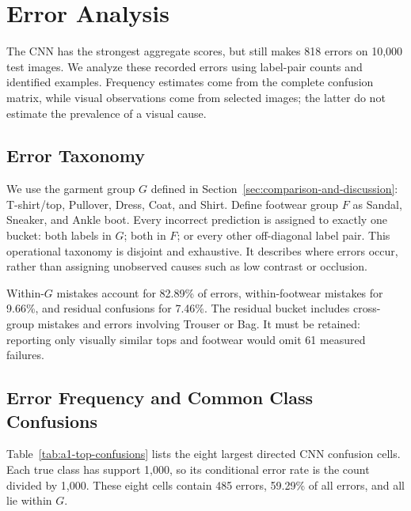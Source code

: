 \section{Error Analysis}
\label{sec:error-analysis}

The CNN has the strongest aggregate scores, but still makes 818 errors on 10,000 test images. We analyze these recorded errors using label-pair counts and identified examples. Frequency estimates come from the complete confusion matrix, while visual observations come from selected images; the latter do not estimate the prevalence of a visual cause.

\subsection{Error Taxonomy}

We use the garment group $G$ defined in Section~\ref{sec:comparison-and-discussion}: T-shirt/top, Pullover, Dress, Coat, and Shirt. Define footwear group $F$ as Sandal, Sneaker, and Ankle boot. Every incorrect prediction is assigned to exactly one bucket: both labels in $G$; both in $F$; or every other off-diagonal label pair. This operational taxonomy is disjoint and exhaustive. It describes where errors occur, rather than assigning unobserved causes such as low contrast or occlusion.

\begin{table}[H]
    \centering
    \caption{Exhaustive CNN error groups. Error shares use denominator 818; test-set shares use 10,000. Percentages are rounded independently.}
    \label{tab:a1-error-taxonomy}
    \small
    
\end{table}

Within-$G$ mistakes account for 82.89\% of errors, within-footwear mistakes for 9.66\%, and residual confusions for 7.46\%. The residual bucket includes cross-group mistakes and errors involving Trouser or Bag. It must be retained: reporting only visually similar tops and footwear would omit 61 measured failures.

\subsection{Error Frequency and Common Class Confusions}

Table~\ref{tab:a1-top-confusions} lists the eight largest directed CNN confusion cells. Each true class has support 1,000, so its conditional error rate is the count divided by 1,000. These eight cells contain 485 errors, 59.29\% of all errors, and all lie within $G$.

